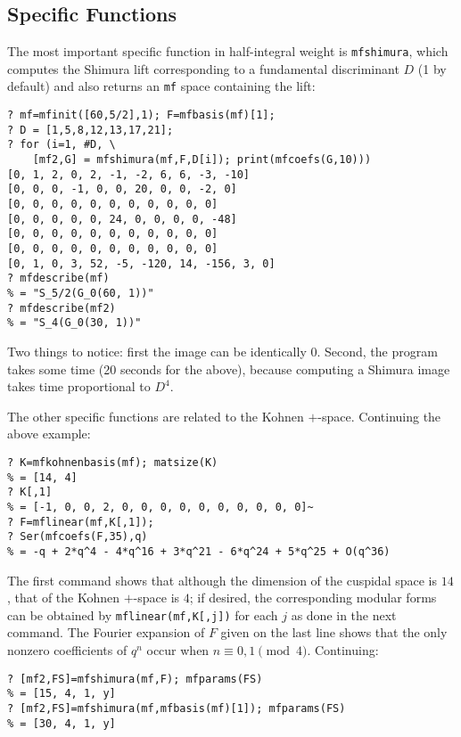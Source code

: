\documentclass[11pt]{article}
\def\kbd#1{{\tt #1}}
\begin{document}
\subsection{Specific Functions}

The most important specific function in half-integral weight is
\kbd{mfshimura}, which computes the Shimura lift corresponding to a
fundamental discriminant $D$ (1 by default) and also returns an \kbd{mf} space
containing the lift:

\begin{verbatim}
? mf=mfinit([60,5/2],1); F=mfbasis(mf)[1];
? D = [1,5,8,12,13,17,21];
? for (i=1, #D, \
    [mf2,G] = mfshimura(mf,F,D[i]); print(mfcoefs(G,10)))
[0, 1, 2, 0, 2, -1, -2, 6, 6, -3, -10]
[0, 0, 0, -1, 0, 0, 20, 0, 0, -2, 0]
[0, 0, 0, 0, 0, 0, 0, 0, 0, 0, 0]
[0, 0, 0, 0, 0, 24, 0, 0, 0, 0, -48]
[0, 0, 0, 0, 0, 0, 0, 0, 0, 0, 0]
[0, 0, 0, 0, 0, 0, 0, 0, 0, 0, 0]
[0, 1, 0, 3, 52, -5, -120, 14, -156, 3, 0]
? mfdescribe(mf)
% = "S_5/2(G_0(60, 1))"
? mfdescribe(mf2)
% = "S_4(G_0(30, 1))"
\end{verbatim}

Two things to notice: first the image can be identically $0$.
Second, the program takes some time (20 seconds for the above), because
computing a Shimura image takes time proportional to $D^4$.

\smallskip

The other specific functions are related to the Kohnen $+$-space. Continuing
the above example:

\begin{verbatim}
? K=mfkohnenbasis(mf); matsize(K)
% = [14, 4]
? K[,1]
% = [-1, 0, 0, 2, 0, 0, 0, 0, 0, 0, 0, 0, 0, 0]~
? F=mflinear(mf,K[,1]);
? Ser(mfcoefs(F,35),q)
% = -q + 2*q^4 - 4*q^16 + 3*q^21 - 6*q^24 + 5*q^25 + O(q^36)
\end{verbatim}

The first command shows that although the dimension of the cuspidal space
is $14$, that of the Kohnen $+$-space is $4$; if desired, the corresponding
modular forms can be obtained by \kbd{mflinear(mf,K[,j])} for each $j$ as
done in the next command. The Fourier expansion of $F$ given
on the last line shows that the only nonzero coefficients of $q^n$ occur
when $n\equiv0,1\pmod4$. Continuing:

\begin{verbatim}
? [mf2,FS]=mfshimura(mf,F); mfparams(FS)
% = [15, 4, 1, y]
? [mf2,FS]=mfshimura(mf,mfbasis(mf)[1]); mfparams(FS)
% = [30, 4, 1, y]
\end{verbatim}
\end{document}
